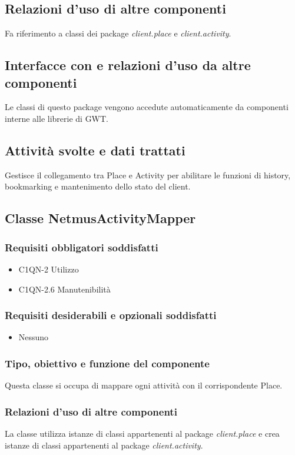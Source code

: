 \subsection*{Relazioni d'uso di altre componenti}
Fa riferimento a classi dei package \emph{client.place} e
\emph{client.activity}. 
\subsection*{Interfacce con e relazioni d'uso da altre componenti}
Le classi di questo package vengono accedute automaticamente da componenti
interne alle librerie di GWT. 
\subsection*{Attivit\`a svolte e dati trattati}
Gestisce il collegamento tra Place e Activity per abilitare le funzioni di
history, bookmarking e mantenimento dello stato del client.

\subsection{Classe NetmusActivityMapper}
\subsubsection*{Requisiti obbligatori soddisfatti}
\begin{itemize}
	\item C1QN-2 Utilizzo
	\item C1QN-2.6 Manutenibilit\`a
\end{itemize}
\subsubsection*{Requisiti desiderabili e opzionali soddisfatti}
\begin{itemize}
    \item Nessuno
\end{itemize}
\subsubsection*{Tipo, obiettivo e funzione del componente}
Questa classe si occupa di mappare ogni attivit\`a con il corrispondente Place.
\subsubsection*{Relazioni d'uso di altre componenti}
La classe utilizza istanze di classi appartenenti al package
\emph{client.place} e crea istanze di classi appartenenti al package
\emph{client.activity}.

